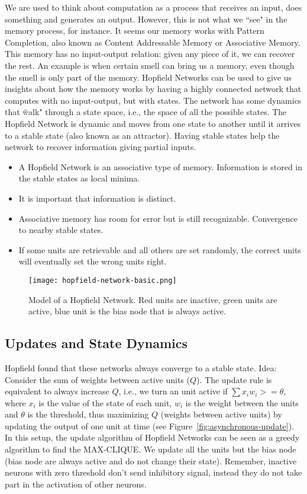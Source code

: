 \documentclass[main]{subfiles}
\begin{document}
We are used to think about computation as a process that receives an input, does something and generates an output.
However, this is not what we ``see" in the memory process, for instance.
It seems our memory works with Pattern Completion, also known as Content Addressable Memory or Associative Memory.
This memory has no input-output relation: given any piece of it, we can recover the rest.
An example is when certain smell can bring us a memory, even though the smell is only part of the memory.
Hopfield Networks can be used to give us insights about how the memory works by having a highly connected network that computes with no input-output, but with states.
The network has some dynamics that \"walk" through a state space, i.e., the space of all the possible states. The Hopfield Network is dynamic and moves from one state to another until it arrives to a stable state (also known as an attractor). Having stable states help the network to recover information giving partial inputs.


\begin{itemize}[noitemsep,nolistsep]
	\item A Hopfield Network is an associative type of memory. Information is stored in the stable states as local minima.
	\item It is important that information is distinct.
	\item Associative memory has room for error but is still recognizable. Convergence to nearby stable states.
	\item If some units are retrievable and all others are set randomly, the correct units will eventually set the wrong units right.
\end{itemize}

\begin{figure}[H]
	\centering
	\texttt{[image: hopfield-network-basic.png]}
	\caption{Model of a Hopfield Network. Red units are inactive, green units are active, blue unit is the bias node that is always active.}
\end{figure}

\subsection{Updates and State Dynamics}

Hopfield found that these networks always converge to a stable state.
Idea: Consider the sum of weights between active units ($Q$).
The update rule is equivalent to always increase $Q$, i.e., we turn an unit active if $\sum x_i w_i >= \theta$, where $x_i$ is the value of the state of each unit, $w_i$ is the weight between the units and $\theta$ is the threshold, thus maximizing $Q$ (weights between active units) by updating the output of one unit at time (see Figure~\ref{fig:asynchronous-update}).
In this setup, the update algorithm of Hopfield Networks can be seen as a greedy algorithm to find the MAX-CLIQUE.
We update all the units but the bias node (bias node are always active and do not change their state).
Remember, inactive neurons with zero threshold don't send inhibitory signal, instead they do not take part in the activation of other neurons.
\end{document}
